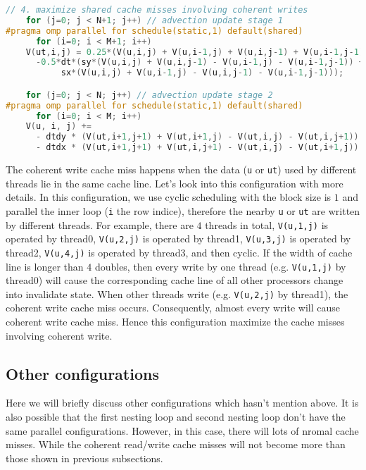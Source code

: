 \begin{lstlisting}[language=c]
// 4. maximize shared cache misses involving coherent writes
    for (j=0; j < N+1; j++) // advection update stage 1
#pragma omp parallel for schedule(static,1) default(shared)
      for (i=0; i < M+1; i++) 
	V(ut,i,j) = 0.25*(V(u,i,j) + V(u,i-1,j) + V(u,i,j-1) + V(u,i-1,j-1))
	  -0.5*dt*(sy*(V(u,i,j) + V(u,i,j-1) - V(u,i-1,j) - V(u,i-1,j-1)) +
		   sx*(V(u,i,j) + V(u,i-1,j) - V(u,i,j-1) - V(u,i-1,j-1)));

    for (j=0; j < N; j++) // advection update stage 2
#pragma omp parallel for schedule(static,1) default(shared)
      for (i=0; i < M; i++) 
	V(u, i, j) +=
	  - dtdy * (V(ut,i+1,j+1) + V(ut,i+1,j) - V(ut,i,j) - V(ut,i,j+1))
	  - dtdx * (V(ut,i+1,j+1) + V(ut,i,j+1) - V(ut,i,j) - V(ut,i+1,j));
\end{lstlisting}

The coherent write cache miss happens when the data (\lstinline{u} or \lstinline{ut}) used by different threads lie in the same cache line.
Let's look into this configuration with more details. 
In this configuration, we use cyclic scheduling with the block size is $1$ and parallel the inner loop (\lstinline{i} the row indice), therefore the nearby \lstinline{u} or \lstinline{ut} are written by different threads. 
For example, there are $4$ threads in total, \lstinline{V(u,1,j)} is operated by thread0, \lstinline{V(u,2,j)} is operated by thread1, \lstinline{V(u,3,j)} is operated by thread2, \lstinline{V(u,4,j)} is operated by thread3, and then cyclic.
If the width of cache line is longer than $4$ doubles, then every write by one thread (e.g. \lstinline{V(u,1,j)} by thread0) will cause the corresponding cache line of all other processors change into invalidate state. When other threads write (e.g. \lstinline{V(u,2,j)} by thread1), the coherent write cache miss occurs. 
Consequently, almost every write will cause coherent write cache miss. Hence this configuration maximize the cache misses involving coherent write.


\subsection{Other configurations}
Here we will briefly discuss other configurations which hasn't mention above.
It is also possible that the first nesting loop and second nesting loop don't have the same parallel configurations. However, in this case, there will lots of nromal cache misses. While the coherent read/write cache misses will not become more than those shown in previous subsections.



